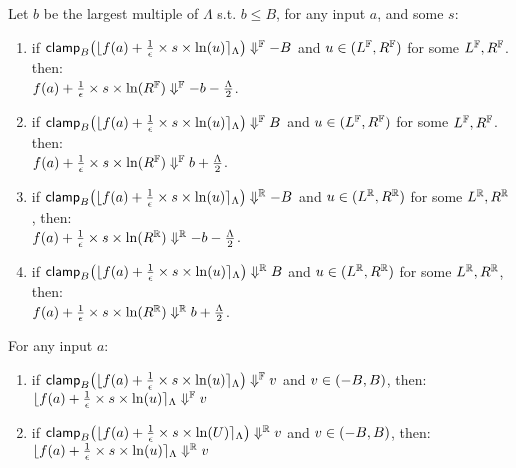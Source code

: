 \documentclass[a4paper,11pt]{article}
\begin{document}
\begin{lem}[clampR]
\label{lem:clampr}
Let $b$ be the largest multiple of $\Lambda$ s.t. $ b \leq B$, for any input $a$, and some $s$:
\begin{enumerate}
\item 
if 
$\mathsf{clamp}_B \big(
	\lfloor f(a) + \frac{1}{\epsilon} \times s \times \ln (u) \rceil_{\Lambda}
	\big)
	\Downarrow^{\mathbb{F}} -B$ and $u \in (L^{\mathbb{F}}, R^{\mathbb{F}})$ for some $L^{\mathbb{F}}, R^{\mathbb{F}}$.
	 then:
	 \\
	$f(a) + \frac{1}{\epsilon} \times s \times \ln (R^{\mathbb{F}}) \Downarrow^{\mathbb{F}} -b - \frac{\Lambda}{2}$.
%
\item 
if 
$\mathsf{clamp}_B \big(
	\lfloor f(a) + \frac{1}{\epsilon} \times s \times \ln (u) \rceil_{\Lambda}
	\big)
	\Downarrow^{\mathbb{F}} B$ and $u \in (L^{\mathbb{F}}, R^{\mathbb{F}})$ for some $L^{\mathbb{F}}, R^{\mathbb{F}}$.
	 then:
	 \\
	$f(a) + \frac{1}{\epsilon} \times s \times \ln (R^{\mathbb{F}}) \Downarrow^{\mathbb{F}} b + \frac{\Lambda}{2}$.
%
\item
if
$\mathsf{clamp}_B \big(
	\lfloor f(a) + \frac{1}{\epsilon} \times s \times \ln (u) \rceil_{\Lambda}
	\big)
	\Downarrow^{\mathbb{R}} -B$ and $u \in (L^{\mathbb{R}}, R^{\mathbb{R}})$ for some $L^{\mathbb{R}}, R^{\mathbb{R}}$, then:
	 \\
	$f(a) + \frac{1}{\epsilon} \times s \times \ln (R^{\mathbb{R}}) \Downarrow^{\mathbb{R}} -b - \frac{\Lambda}{2}$.
%
\item
if
$\mathsf{clamp}_B \big(
	\lfloor f(a) + \frac{1}{\epsilon} \times s \times \ln (u) \rceil_{\Lambda}
	\big)
	\Downarrow^{\mathbb{R}} B$ and $u \in (L^{\mathbb{R}}, R^{\mathbb{R}})$ for some $L^{\mathbb{R}}, R^{\mathbb{R}}$, then:
	 \\
	$f(a) + \frac{1}{\epsilon} \times s \times \ln (R^{\mathbb{R}}) \Downarrow^{\mathbb{R}} b + \frac{\Lambda}{2}$.
%
\end{enumerate}
\end{lem}
%
%
\begin{lem}[clampId]
\label{lem:clampid}
For any input $a$:
\begin{enumerate}
\item 
if 
$\mathsf{clamp}_B \big(
	\lfloor f(a) + \frac{1}{\epsilon} \times s \times \ln (u) \rceil_{\Lambda}
	\big)
	\Downarrow^{\mathbb{F}} v$ and $v \in (-B, B)$, then:
	$\lfloor f(a) + \frac{1}{\epsilon} \times s \times \ln (u) \rceil_{\Lambda}
	\Downarrow^{\mathbb{F}} v$
%
\item
if
$\mathsf{clamp}_B \big(
	\lfloor f(a) + \frac{1}{\epsilon} \times s \times \ln (U) \rceil_{\Lambda}
	\big)
	\Downarrow^{\mathbb{R}} v$ and $v \in (-B, B)$, then:
	$\lfloor f(a) + \frac{1}{\epsilon} \times s \times \ln (u) \rceil_{\Lambda}
	\Downarrow^{\mathbb{R}} v$
\end{enumerate}
\end{lem}
\end{document}
